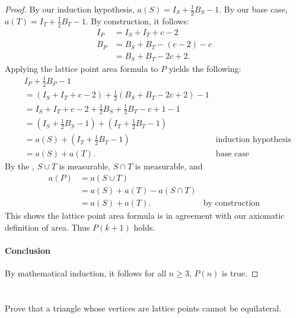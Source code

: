 \documentclass{article}
\begin{document}
\begin{proof}
    By our induction hypothesis, $a(S) = I_S + \frac{1}{2}B_S - 1$.
    By our base case, $a(T) = I_T + \frac{1}{2}B_T - 1$.
    By construction, it follows:
      \begin{align*}
        I_P & = I_S + I_T + c - 2 \\
        B_P & = B_S + B_T - (c - 2) - c \\
            & = B_S + B_T - 2c + 2.
      \end{align*}
    Applying the lattice point area formula to $P$ yields the following:
      \begin{align*}
        & I_P + \frac{1}{2}B_P - 1 \\
          & = (I_S + I_T + c - 2) + \frac{1}{2}(B_S + B_T - 2c + 2) - 1 \\
          & = I_S + I_T + c - 2 + \frac{1}{2}B_S + \frac{1}{2}B_T - c + 1 - 1 \\
          & = (I_S + \frac{1}{2}B_S - 1) + (I_T + \frac{1}{2}B_T - 1) \\
          & = a(S) + (I_T + \frac{1}{2}B_T - 1) & \text{induction hypothesis} \\
          & = a(S) + a(T). & \text{base case}
      \end{align*}
    By the , $S \cup T$ is measurable,
      $S \cap T$ is measurable, and
      \begin{align*}
        a(P)
          & = a(S \cup T) \\
          & = a(S) + a(T) - a(S \cap T) \\
          & = a(S) + a(T). & \text{by construction}
      \end{align*}
    This shows the lattice point area formula is in agreement with our axiomatic
      definition of area.
    Thus $P(k + 1)$ holds.

  \paragraph{Conclusion}%

    By mathematical induction, it follows for all $n \geq 3$, $P(n)$ is true.

\end{proof}

\section*{}%
%

Prove that a triangle whose vertices are lattice points cannot be equilateral.
\end{document}
